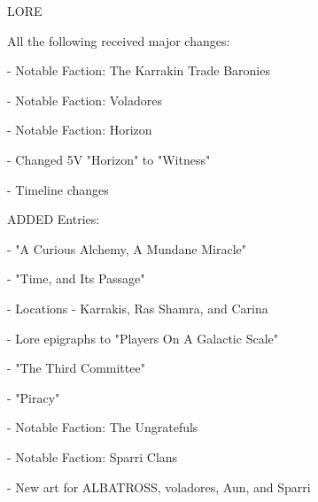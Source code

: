 LORE  

All the following received major changes:
 
     -    Notable Faction: The Karrakin Trade Baronies
 

     -    Notable Faction: Voladores
 
     -    Notable Faction: Horizon
 
     -    Changed 5V "Horizon" to "Witness" 
 

     -    Timeline changes
 

ADDED Entries:
 
     -    "A Curious Alchemy, A Mundane Miracle"
 
     -    "Time, and Its Passage"
 
     -    Locations - Karrakis, Ras Shamra, and Carina
 

     -    Lore epigraphs to "Players On A Galactic Scale"
 
     -    "The Third Committee"
 
     -    "Piracy"
 

     -    Notable Faction: The Ungratefuls
 
     -    Notable Faction: Sparri Clans
 
     -    New art for ALBATROSS, voladores, Aun, and Sparri
 

 
 